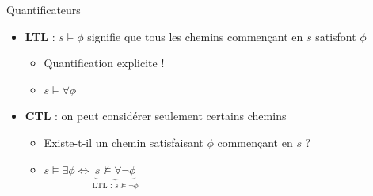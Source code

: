\documentclass[compress]{beamer}
\begin{document}
\begin{frame}{Quantificateurs}
\begin{itemize}
  \item \textbf{\color{fibeamer@orange}LTL} : $s\models\phi$ signifie que tous les chemins commençant en $s$ satisfont $\phi$
  \begin{itemize}
    \item Quantification explicite !
    \item $s \models \forall \phi$
  \end{itemize}
  \item \textbf{\color{fibeamer@orange}CTL} : on peut considérer seulement certains chemins
  \begin{itemize}
    \item Existe-t-il un chemin satisfaisant $\phi$ commençant en $s$ ?
    \item $s \models \exists \phi \iff \underbrace{s \not\models \forall \neg \phi}_{\text{LTL : }s \not \models \neg \phi}$
  \end{itemize}
\end{itemize}
\end{frame}
\end{document}
